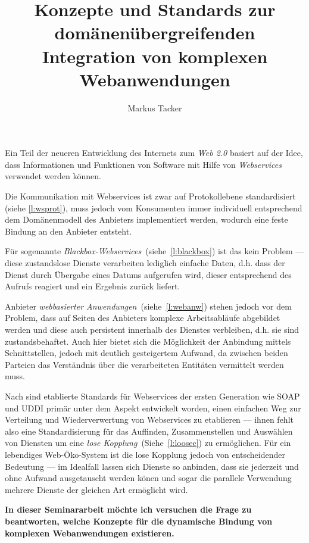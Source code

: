 \documentclass[10pt,a4paper]{article}
\begin{document}
\author{Markus Tacker}
\title{Konzepte und Standards zur domänenübergreifenden Integration von komplexen Webanwendungen}
\maketitle
Ein Teil der neueren Entwicklung des Internets zum \emph{Web 2.0} basiert auf der Idee, dass Informationen und Funktionen von Software mit Hilfe von \emph{Webservices} verwendet werden können. \cite{hn-web20}

Die Kommunikation mit Webservices ist zwar auf Protokollebene standardisiert (siehe \ref{l:wsprot}), muss jedoch vom Konsumenten immer individuell entsprechend dem Domänenmodell des Anbieters implementiert werden, wodurch eine feste Bindung an den Anbieter entsteht.

Für sogenannte \emph{Blackbox-Webservices}~(siehe~\ref{l:blackbox}) ist das kein Problem --- diese zustandslose Dienste verarbeiten lediglich einfache Daten, d.h. dass der Dienst durch Übergabe eines Datums aufgerufen wird, dieser entsprechend des Aufrufs reagiert und ein Ergebnis zurück liefert.

Anbieter \emph{webbasierter Anwendungen}~(siehe~\ref{l:webanw}) stehen jedoch vor dem Problem, dass auf Seiten des Anbieters komplexe Arbeitsabläufe abgebildet werden und diese auch persistent innerhalb des Dienstes verbleiben, d.h. sie sind zustandsbehaftet. Auch hier bietet sich die Möglichkeit der Anbindung mittels Schnittstellen, jedoch mit deutlich gesteigertem Aufwand, da zwischen beiden Parteien das Verständnis über die verarbeiteten Entitäten vermittelt werden muss. 

Nach \cite[Seite 653]{ei-sawsdl} sind etablierte Standards für Webservices der ersten Generation wie \acs{SOAP} und \acs{UDDI} primär unter dem Aspekt entwickelt worden, einen einfachen Weg zur Verteilung und Wiederverwertung von Webservices zu etablieren --- ihnen fehlt also eine Standardisierung für das Auffinden, Zusammenstellen und Auswählen von Diensten um eine \emph{lose Kopplung}~(Siehe~\ref{l:loosec}) zu ermöglichen. Für ein lebendiges Web-Öko-System ist die lose Kopplung jedoch von entscheidender Bedeutung --- im Idealfall lassen sich Dienste so anbinden, dass sie jederzeit und ohne Aufwand ausgetauscht werden könen und sogar die parallele Verwendung mehrere Dienste der gleichen Art ermöglicht wird.

\textbf{In dieser Seminararbeit möchte ich versuchen die Frage zu beantworten, welche Konzepte für die dynamische Bindung von komplexen Webanwendungen existieren.}
\end{document}
